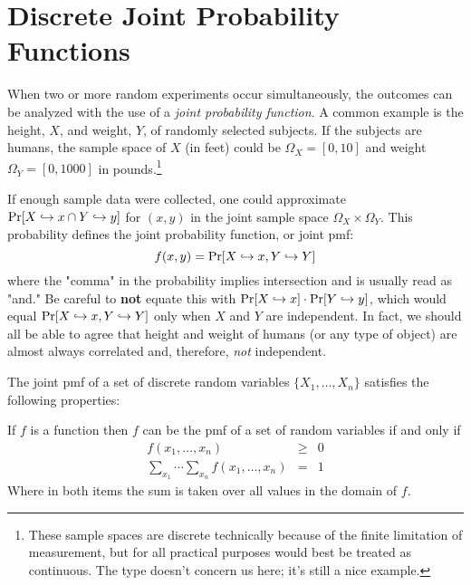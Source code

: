 \documentclass[../main.tex]{subfiles}
\begin{document}
\section{Discrete Joint Probability Functions}

When two or more random experiments occur simultaneously, the 
outcomes can be analyzed with the use of a \textit{joint probability
function}. A common example is the height, $X$,  and weight, $Y$, of randomly selected subjects. If the subjects are humans, the sample space of $X$ (in feet) could 
be $\Omega_X = [0,10]$ and weight $\Omega_Y = [0,1000]$ in pounds.\footnote{These
sample spaces are discrete technically because of the finite limitation
of measurement, but for all practical purposes would best be treated as
continuous. The type doesn't concern us here; it's still a nice example.}

If enough sample data were collected, one could approximate $\mathrm{Pr}[X \hookrightarrow x \cap Y \hookrightarrow y]$ for $(x,y)$ in the joint sample space $\Omega_X \times
\Omega_Y$. This probability defines the joint probability function, or joint pmf:
$$f(x,y) = \mathrm{Pr}[X \hookrightarrow x, Y \hookrightarrow Y]$$
where the "comma" in the probability implies intersection and is usually read as "and." Be careful to \textbf{not} equate this with $\mathrm{Pr}[X \hookrightarrow x]\cdot\mathrm{Pr}[Y \hookrightarrow y]$, which would equal $\mathrm{Pr}[X \hookrightarrow x, Y \hookrightarrow Y]$
only when $X$ and $Y$ are independent. In fact, we should all be able to agree that height and weight of humans (or any type of object) are
almost always correlated and, therefore, \textit{not} independent.

The joint pmf of a set of discrete random variables $\{X_1, \ldots, X_n\}$
satisfies the following properties:
\begin{theorem} If $f$ is a function then $f$ can be the pmf of a set of random variables if and only if
\begin{eqnarray}
     f(x_1,\ldots,x_n) &\geq& 0 \\
    \sum_{x_1}\cdots\sum_{x_n}f(x_1,\ldots,x_n) &=& 1
\end{eqnarray}
Where in both items the sum is taken over all values in the domain of $f$.
\end{theorem}
\end{document}
